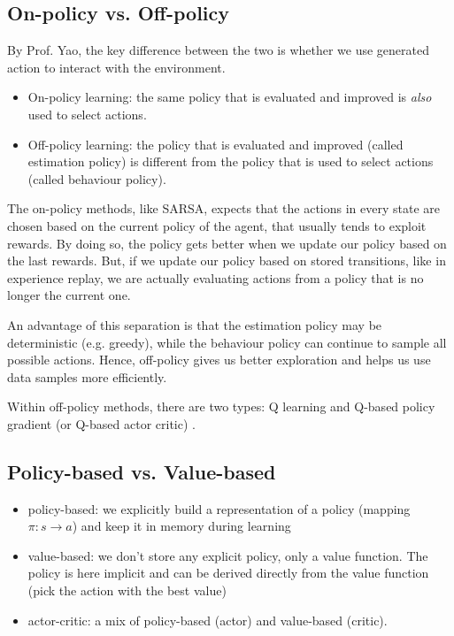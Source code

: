\documentclass[lang=en,mode=normal,device=normal,color=blue,12pt]{elegantnote}
\DeclareMathOperator*{\1}{\mathbbm{1}}
\begin{document}
\begin{appendices}
\subsection{On-policy vs. Off-policy}
\label{appendix:on-off-policy}

By Prof. Yao, the key difference between the two is whether we use generated action to interact with the environment.

\begin{itemize}
\item On-policy learning: the same policy that is evaluated and improved is \textit{also} used to select actions.
\item Off-policy learning: the policy that is evaluated and improved (called estimation policy) is different from the policy that is used to select actions (called behaviour policy).
\end{itemize}

The on-policy methods, like SARSA, expects that the actions in every state are chosen based on the current policy of the agent, that usually tends to exploit rewards. By doing so, the policy gets better when we update our policy based on the last rewards. But, if we update our policy based on stored transitions, like in experience replay, we are actually evaluating actions from a policy that is no longer the current one.

An advantage of this separation is that the estimation policy may be deterministic (e.g. greedy), while the behaviour policy can continue to sample all possible actions.
Hence, off-policy gives us better exploration and helps us use data samples more efficiently.

Within off-policy methods, there are two types: Q learning and Q-based policy gradient (or Q-based actor critic) \cite{ytbcs287}.

\subsection{Policy-based vs. Value-based}

\begin{itemize}
\item policy-based: we explicitly build a representation of a policy (mapping $\pi:s\rightarrow a$) and keep it in memory during learning
\item value-based: we don't store any explicit policy, only a value function. The policy is here implicit and can be derived directly from the value function (pick the action with the best value)
\item actor-critic: a mix of policy-based (actor) and value-based (critic).
\end{itemize}


\end{appendices}
\end{document}
